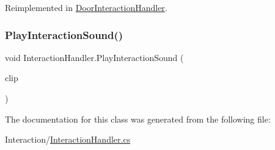 Reimplemented in \mbox{\hyperlink{class_door_interaction_handler_a2621737500ee61f39f1873cf2353831c}{Door\+Interaction\+Handler}}.

\mbox{\label{class_interaction_handler_aecb9eb68b09058f64831e337022868d5}} 
\subsubsection{\texorpdfstring{Play\+Interaction\+Sound()}{PlayInteractionSound()}}
{\footnotesize\ttfamily void Interaction\+Handler.\+Play\+Interaction\+Sound (\begin{DoxyParamCaption}\item[{Audio\+Clip}]{clip }\end{DoxyParamCaption})\hspace{0.3cm}{\ttfamily [protected]}}



The documentation for this class was generated from the following file\+:\begin{DoxyCompactItemize}
\item 
Interaction/\mbox{\hyperlink{_interaction_handler_8cs}{Interaction\+Handler.\+cs}}\end{DoxyCompactItemize}
